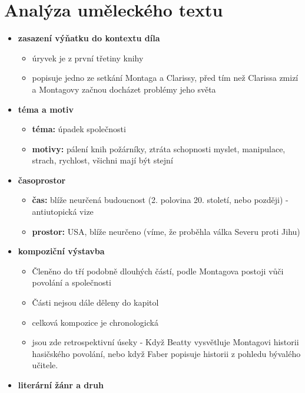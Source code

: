 \documentclass[11pt]{article}
\begin{document}
    \section*{Analýza uměleckého textu}
    \begin{itemize}
        \item\textbf{zasazení výňatku do kontextu díla}
        \begin{itemize}
            \item úryvek je z první třetiny knihy
            \item popisuje jedno ze setkání Montaga a Clarissy, před tím než Clarissa zmizí a Montagovy začnou docházet problémy jeho světa
        \end{itemize}
        \item\textbf{téma a motiv}
        \begin{itemize}
            \item\textbf{téma: }úpadek společnosti
            \item\textbf{motivy: }pálení knih požárníky, ztráta schopnosti myslet, manipulace, strach, rychlost, všichni mají být stejní
        \end{itemize}
        \item\textbf{časoprostor}
        \begin{itemize}
            \item\textbf{čas: }blíže neurčená budoucnost (2. polovina 20. století, nebo později) - antiutopická vize
            \item\textbf{prostor: }USA, blíže neurčeno (víme, že proběhla válka Severu proti Jihu)
        \end{itemize}
        \item\textbf{kompoziční výstavba}
        \begin{itemize}
            \item Členěno do tří podobně dlouhých částí, podle Montagova postoji vůči povolání a společnosti
            \item Části nejsou dále děleny do kapitol
            \item celková kompozice je chronologická
            \item jsou zde retrospektivní úseky - Když Beatty vysvětluje Montagovi historii hasičského povolání, nebo když Faber popisuje historii z pohledu bývalého učitele.
        \end{itemize}
        \item\textbf{literární žánr a druh}
        \begin{itemize}

\end{itemize}
\end{itemize}
\end{document}
